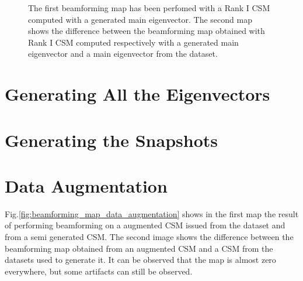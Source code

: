 \documentclass[11pt,a4paper,twoside]{report}
\begin{document}
\begin{figure}
    \centering
    \caption{The first beamforming map has been perfomed with a Rank I CSM computed with a generated main eigenvector. The second map shows the difference between the beamforming map obtained with Rank I CSM computed respectively with a generated main eigenvector and a main eigenvector from the dataset.}
    \label{fig:beamforming_map_main_evec_wgangp}    
\end{figure}

\section{Generating All the Eigenvectors}

\section{Generating the Snapshots}

\section{Data Augmentation}

Fig.\ref{fig:beamforming_map_data_augmentation} shows in the first map the result of performing beamforming on a augmented CSM issued from the dataset and from a semi generated CSM. The second image shows the difference between the beamforming map obtained from an augmented CSM and a CSM from the datasets used to generate it. It can be observed that the map is almost zero everywhere, but some artifacts can still be observed.
\end{document}
